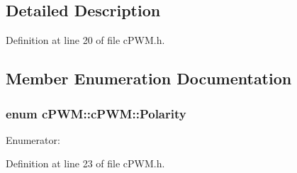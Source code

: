 \subsection{\-Detailed \-Description}


\-Definition at line 20 of file c\-P\-W\-M.\-h.



\subsection{\-Member \-Enumeration \-Documentation}
\hypertarget{classc_p_w_m_1_1c_p_w_m_af190eac685b62a4a27e3b9b6fc3aba09}{
\subsubsection[{\-Polarity}]{\setlength{\rightskip}{0pt plus 5cm}enum {\bf c\-P\-W\-M\-::c\-P\-W\-M\-::\-Polarity}}}\label{classc_p_w_m_1_1c_p_w_m_af190eac685b62a4a27e3b9b6fc3aba09}
\begin{Desc}
\item[\-Enumerator\-: ]\par
\begin{description}
\item[{\em 
\hypertarget{classc_p_w_m_1_1c_p_w_m_af190eac685b62a4a27e3b9b6fc3aba09a7e9862f0d7812ec1c9c89797aa8abf25}{\-Active\-High}\label{classc_p_w_m_1_1c_p_w_m_af190eac685b62a4a27e3b9b6fc3aba09a7e9862f0d7812ec1c9c89797aa8abf25}
}]\item[{\em 
\hypertarget{classc_p_w_m_1_1c_p_w_m_af190eac685b62a4a27e3b9b6fc3aba09a94c88fb15c7102bd8e872e84170f69d6}{\-Active\-Low}\label{classc_p_w_m_1_1c_p_w_m_af190eac685b62a4a27e3b9b6fc3aba09a94c88fb15c7102bd8e872e84170f69d6}
}]\end{description}
\end{Desc}



\-Definition at line 23 of file c\-P\-W\-M.\-h.



